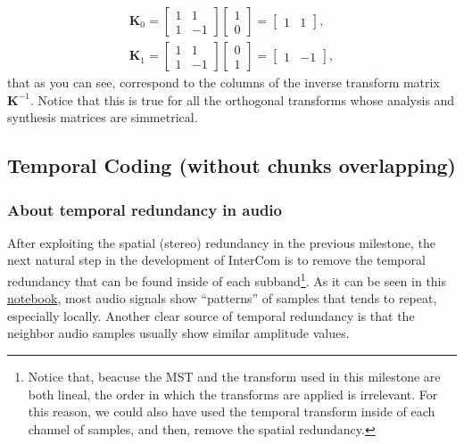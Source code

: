 \begin{equation}
  \begin{array}{l}
    {\mathbf K}_0 =
    \begin{bmatrix}
      1 & 1 \\
      1 & -1
    \end{bmatrix}
          \begin{bmatrix}
            1 \\
            0
          \end{bmatrix}
    =
    \begin{bmatrix}
      1 & 1
    \end{bmatrix},
    \\
    {\mathbf K}_1 = 
    \begin{bmatrix}
      1 & 1 \\
      1 & -1
    \end{bmatrix}
          \begin{bmatrix}
            0 \\
            1
          \end{bmatrix}
    =
    \begin{bmatrix}
      1 & -1
    \end{bmatrix},
  \end{array}
\end{equation}
that as you can see, correspond to the columns of the inverse
transform matrix ${\mathbf K}^{-1}$. Notice that this is true for all
the orthogonal transforms whose analysis and synthesis matrices are
simmetrical.%


\subsection{Temporal Coding (without chunks overlapping)}

\subsubsection{About temporal redundancy in audio}

After exploiting the spatial (stereo) redundancy in the previous
milestone, the next natural step in the development of InterCom is to
remove the temporal redundancy that can be found inside of each
subband\footnote{Notice that, beacuse the MST and the transform used
  in this milestone are both lineal, the order in which the transforms
  are applied is irrelevant. For this reason, we could also have used
  the temporal transform inside of each channel of samples, and then,
  remove the spatial redundancy.}. As it can be seen in this
\href{https://github.com/Tecnologias-multimedia/intercom/blob/master/tools/audio_viewer.ipynb}{notebook},
most audio signals show ``patterns'' of samples that tends to repeat,
especially locally. Another clear source of temporal redundancy is
that the neighbor audio samples usually show similar amplitude values.

